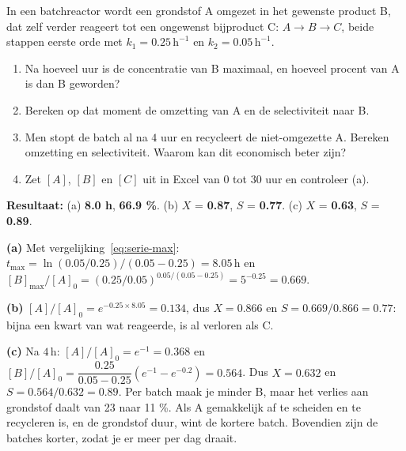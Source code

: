\begin{oefening}
In een batchreactor wordt een grondstof A omgezet in het gewenste product B, dat zelf verder reageert tot een ongewenst bijproduct C: \(A \rightarrow B \rightarrow C\), beide stappen eerste orde met \(k_1 = 0.25\,\mathrm{h^{-1}}\) en \(k_2 = 0.05\,\mathrm{h^{-1}}\).

\begin{enumerate}
\item[(a)]
  Na hoeveel uur is de concentratie van B maximaal, en hoeveel procent van A is dan B geworden?
\item[(b)]
  Bereken op dat moment de omzetting van A en de selectiviteit naar B.
\item[(c)]
  Men stopt de batch al na \(4\) uur en recycleert de niet-omgezette A. Bereken omzetting en selectiviteit. Waarom kan dit economisch beter zijn?
\item[(d)]
  Zet \([A]\), \([B]\) en \([C]\) uit in Excel van \(0\) tot \(30\) uur en controleer (a).
\end{enumerate}
\end{oefening}
\begin{oplossing}
\textbf{Resultaat:} (a) \textbf{8.0 h}, \textbf{66.9 \%}. (b) \(X\) = \textbf{0.87}, \(S\) = \textbf{0.77}. (c) \(X\) = \textbf{0.63}, \(S\) = \textbf{0.89}.

\textbf{(a)} Met vergelijking~\eqref{eq:serie-max}: \(t_\mathrm{max} = \ln(0.05/0.25)/(0.05 - 0.25) = 8.05\,\mathrm{h}\) en \([B]_\mathrm{max}/[A]_0 = (0.25/0.05)^{0.05/(0.05-0.25)} = 5^{-0.25} = 0.669\).

\textbf{(b)} \([A]/[A]_0 = e^{-0.25 \times 8.05} = 0.134\), dus \(X = 0.866\) en \(S = 0.669/0.866 = 0.77\): bijna een kwart van wat reageerde, is al verloren als C.

\textbf{(c)} Na \(4\,\mathrm{h}\): \([A]/[A]_0 = e^{-1} = 0.368\) en \([B]/[A]_0 = \dfrac{0.25}{0.05-0.25}(e^{-1} - e^{-0.2}) = 0.564\). Dus \(X = 0.632\) en \(S = 0.564/0.632 = 0.89\). Per batch maak je minder B, maar het verlies aan grondstof daalt van 23 naar 11 \%. Als A gemakkelijk af te scheiden en te recycleren is, en de grondstof duur, wint de kortere batch. Bovendien zijn de batches korter, zodat je er meer per dag draait.
\end{oplossing}

